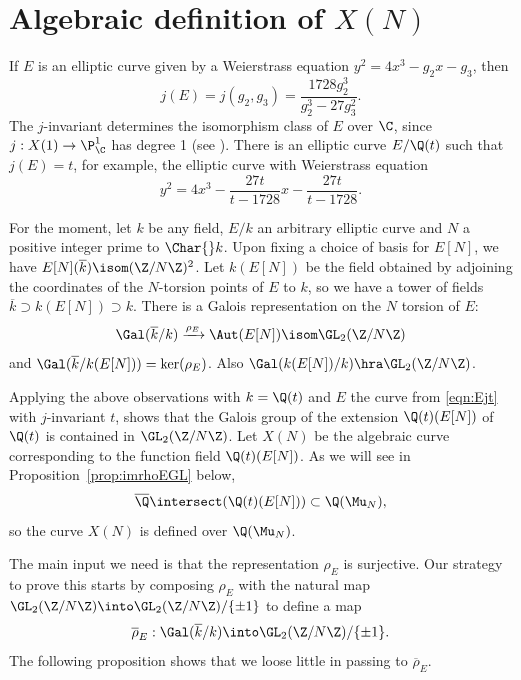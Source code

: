 \documentclass{report}
\begin{document}
\section{Algebraic definition of $X(N)$}
If $E$ is an elliptic curve given by a Weierstrass equation
$y^2=4x^3-g_2x-g_3$,
then $$j(E)=j(g_2,g_3)=\frac{1728g_2^3}{g_2^3-27g_3^2}.$$
The $j$-invariant determines the isomorphism class of $E$ over $\C$,
since $j:X(1)\to\P^1_{\C}$ has degree 1 (see
\cite[VII.3.3]{serre:arithmetic}).  There is an elliptic curve
$E/\Q(t)$ such that $j(E)=t$, for example, the elliptic
curve with Weierstrass equation
\begin{equation}\label{eqn:Ejt}
y^2=4x^3-\frac{27t}{t-1728}x-\frac{27t}{t-1728}.
\end{equation}

For the moment, let $k$ be any field, $E/k$ an arbitrary elliptic
curve and $N$ a positive integer prime to $\Char{} k$. Upon
fixing a choice of basis for $E[N]$, we have
$E[N](\overline{k})\isom(\Z/N\Z)^2$.  Let $k(E[N])$ be the field
obtained by adjoining the coordinates of the $N$-torsion points of
$E$ to $k$, so we have a tower of fields
$\overline{k}\supset k(E[N])\supset k$.
There is a Galois representation on the $N$ torsion of $E$:
$$
  \Gal(\overline{k}/k)\xrightarrow{\rho_{E}}\Aut(E[N])\isom\GL_2(\Z/N\Z)
$$
and
$\Gal(\overline{k}/k(E[N]))=\ker(\rho_{E})$.
Also $\Gal(k(E[N])/k) \hra \GL_2(\Z/N\Z)$.

Applying the above observations with $k=\Q(t)$ and $E$ the curve from
\eqref{eqn:Ejt} with $j$-invariant $t$, shows that the Galois group of
the extension $\Q(t)(E[N])$ of $\Q(t)$ is contained in
$\GL_2(\Z/N\Z)$. Let $X(N)$ be the algebraic curve corresponding to
the function field $\Q(t)(E[N])$. As we will see in
Proposition~\ref{prop:imrhoEGL} below,
$$\overline{\Q}\intersect(\Q(t)(E[N])) \subset \Q(\Mu_N),$$
so the curve $X(N)$ is defined over $\Q(\Mu_N)$.

The main input we need is that the representation $\rho_{E}$
is surjective.
Our strategy to prove this starts
by composing $\rho_{E}$ with the natural map
$\GL_2(\Z/N\Z)\into\GL_2(\Z/N\Z)/\{\pm 1\}$ to define a map
$$
  \overline{\rho}_{E}:\Gal(\overline{k}/k)\into\GL_2(\Z/N\Z)/\{\pm 1\}.
$$
The following proposition
shows that we loose little in passing to $\overline{\rho}_{E}$.
\end{document}
